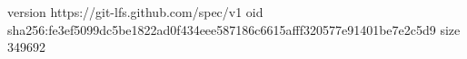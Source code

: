 version https://git-lfs.github.com/spec/v1
oid sha256:fe3ef5099dc5be1822ad0f434eee587186c6615afff320577e91401be7e2c5d9
size 349692
